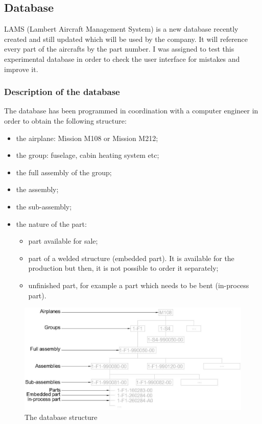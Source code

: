 \documentclass[11pt,a4paper]{article}
\begin{document}

\newpage

\subsection{Database}
LAMS (Lambert Aircraft Management System) is a new database recently created and still updated which will be used by the company. It will reference every part of the aircrafts by the part number.
I was assigned to test this experimental database in order to check the user interface for mistakes and improve it.

\subsubsection{Description of the database}
The database has been programmed in coordination with a computer engineer in order to obtain the following structure:
\begin{itemize}
\setlength{\itemsep}{0pt}
\item the airplane: Mission M108 or Mission M212;
\item the group: fuselage, cabin heating system etc;
\item the full assembly of the group;
\item the assembly;
\item the sub-assembly;
\item the nature of the part: 
\begin{itemize}
\setlength{\itemsep}{0pt}
\item part available for sale;
\item part of a welded structure (embedded part). It is available for the production but then, it is not possible to order it separately;
\item unfinished part, for example a part which needs to be bent (in-process part).
\end{itemize}

\end{itemize}
\begin{figure}[ht!]
	\begin{center}
		\includegraphics[width=15cm]{pics/PIC024.jpg}
		\caption{The database structure}
		\label{fig:PIC024}
	\end{center}
\end{figure}
\end{document}
